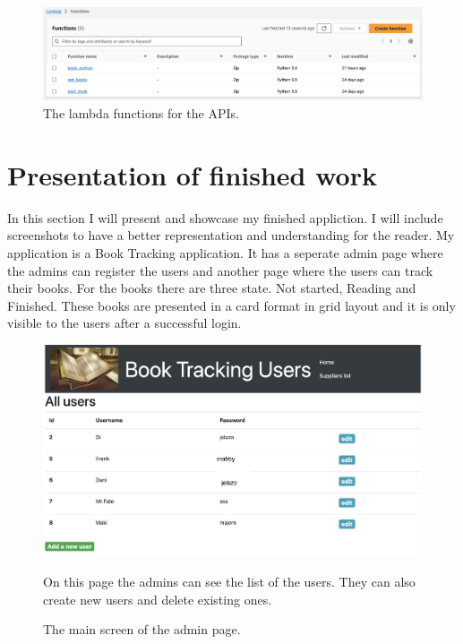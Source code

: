 \documentclass[11pt,a4paper,oneside]{report}
\begin{document}
\begin{figure}[!ht]
  \centering
  \includegraphics[scale=0.4]{lambda_functions.png}
  \caption{The lambda functions for the APIs.}
  \label{fig:TexnicCenter}
\end{figure}


\chapter{Presentation of finished work}

In this section I will present and showcase my finished appliction.
I will include screenshots to have a better representation and understanding for the reader.
My application is a Book Tracking application. It has a seperate admin page where the admins can register the users and another page where the users can track their books.
For the books there are three state. Not started, Reading and Finished. These books are presented in a card format in grid layout and it is only visible to the users after a successful login.


\begin{figure}[!ht]
  \begin{center}
    \includegraphics[scale=0.3]{admin_list.png}
    \caption{The main screen of the admin page.}
    \label{fig:TexnicCenter}
  \end{center}
  On this page the admins can see the list of the users. They can also create new users and delete existing ones.
\end{figure}
\end{document}
